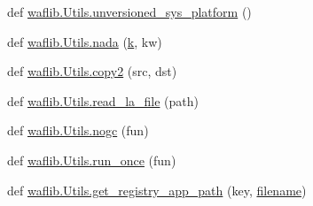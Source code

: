 \begin{DoxyCompactItemize}
\item 
def \hyperlink{namespacewaflib_1_1_utils_a28133bb5f262617cb53203566b622507}{waflib.\+Utils.\+unversioned\+\_\+sys\+\_\+platform} ()
\item 
def \hyperlink{namespacewaflib_1_1_utils_a6696789f3197d4d7ce28251c6fbb7339}{waflib.\+Utils.\+nada} (\hyperlink{rfft2d_test_m_l_8m_adc468c70fb574ebd07287b38d0d0676d}{k}, kw)
\item 
def \hyperlink{namespacewaflib_1_1_utils_aee572b4c10efd729fd5e3408c79c3923}{waflib.\+Utils.\+copy2} (src, dst)
\item 
def \hyperlink{namespacewaflib_1_1_utils_a4e2ef7a36fd70943a5179f154b353fa4}{waflib.\+Utils.\+read\+\_\+la\+\_\+file} (path)
\item 
def \hyperlink{namespacewaflib_1_1_utils_aecd76698a5ada6c82e0a4efbe332b225}{waflib.\+Utils.\+nogc} (fun)
\item 
def \hyperlink{namespacewaflib_1_1_utils_acdbff8b85a82ea90066870d7f6344ea7}{waflib.\+Utils.\+run\+\_\+once} (fun)
\item 
def \hyperlink{namespacewaflib_1_1_utils_a337abeed4baef3a80d2fc8f3ec0044db}{waflib.\+Utils.\+get\+\_\+registry\+\_\+app\+\_\+path} (key, \hyperlink{test__portburn_8cpp_a7efa5e9c7494c7d4586359300221aa5d}{filename})
\end{DoxyCompactItemize}
